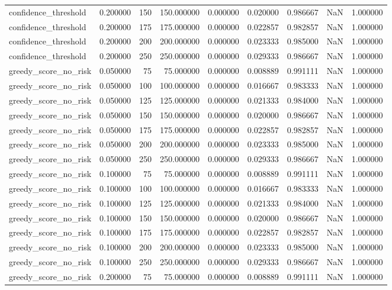 \begin{tabular}{lrrrrrrrr}
confidence_threshold & 0.200000 & 150 & 150.000000 & 0.000000 & 0.020000 & 0.986667 & NaN & 1.000000 \\
confidence_threshold & 0.200000 & 175 & 175.000000 & 0.000000 & 0.022857 & 0.982857 & NaN & 1.000000 \\
confidence_threshold & 0.200000 & 200 & 200.000000 & 0.000000 & 0.023333 & 0.985000 & NaN & 1.000000 \\
confidence_threshold & 0.200000 & 250 & 250.000000 & 0.000000 & 0.029333 & 0.986667 & NaN & 1.000000 \\
greedy_score_no_risk & 0.050000 & 75 & 75.000000 & 0.000000 & 0.008889 & 0.991111 & NaN & 1.000000 \\
greedy_score_no_risk & 0.050000 & 100 & 100.000000 & 0.000000 & 0.016667 & 0.983333 & NaN & 1.000000 \\
greedy_score_no_risk & 0.050000 & 125 & 125.000000 & 0.000000 & 0.021333 & 0.984000 & NaN & 1.000000 \\
greedy_score_no_risk & 0.050000 & 150 & 150.000000 & 0.000000 & 0.020000 & 0.986667 & NaN & 1.000000 \\
greedy_score_no_risk & 0.050000 & 175 & 175.000000 & 0.000000 & 0.022857 & 0.982857 & NaN & 1.000000 \\
greedy_score_no_risk & 0.050000 & 200 & 200.000000 & 0.000000 & 0.023333 & 0.985000 & NaN & 1.000000 \\
greedy_score_no_risk & 0.050000 & 250 & 250.000000 & 0.000000 & 0.029333 & 0.986667 & NaN & 1.000000 \\
greedy_score_no_risk & 0.100000 & 75 & 75.000000 & 0.000000 & 0.008889 & 0.991111 & NaN & 1.000000 \\
greedy_score_no_risk & 0.100000 & 100 & 100.000000 & 0.000000 & 0.016667 & 0.983333 & NaN & 1.000000 \\
greedy_score_no_risk & 0.100000 & 125 & 125.000000 & 0.000000 & 0.021333 & 0.984000 & NaN & 1.000000 \\
greedy_score_no_risk & 0.100000 & 150 & 150.000000 & 0.000000 & 0.020000 & 0.986667 & NaN & 1.000000 \\
greedy_score_no_risk & 0.100000 & 175 & 175.000000 & 0.000000 & 0.022857 & 0.982857 & NaN & 1.000000 \\
greedy_score_no_risk & 0.100000 & 200 & 200.000000 & 0.000000 & 0.023333 & 0.985000 & NaN & 1.000000 \\
greedy_score_no_risk & 0.100000 & 250 & 250.000000 & 0.000000 & 0.029333 & 0.986667 & NaN & 1.000000 \\
greedy_score_no_risk & 0.200000 & 75 & 75.000000 & 0.000000 & 0.008889 & 0.991111 & NaN & 1.000000 \\

\end{tabular}
